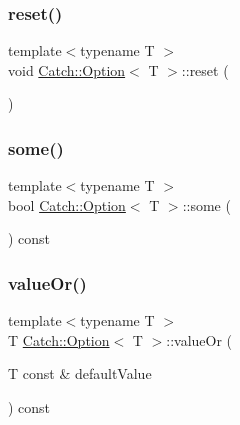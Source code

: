 \mbox{\label{class_catch_1_1_option_a37b4e0e5d4d56296adacd267a616f4e0}} 
\subsubsection{\texorpdfstring{reset()}{reset()}}
{\footnotesize\ttfamily template$<$typename T $>$ \\
void \mbox{\hyperlink{class_catch_1_1_option}{Catch\+::\+Option}}$<$ T $>$\+::reset (\begin{DoxyParamCaption}{ }\end{DoxyParamCaption})\hspace{0.3cm}{\ttfamily [inline]}}

\mbox{\label{class_catch_1_1_option_a97c95829afbe92f2bcc5fd75b32c0825}} 
\subsubsection{\texorpdfstring{some()}{some()}}
{\footnotesize\ttfamily template$<$typename T $>$ \\
bool \mbox{\hyperlink{class_catch_1_1_option}{Catch\+::\+Option}}$<$ T $>$\+::some (\begin{DoxyParamCaption}{ }\end{DoxyParamCaption}) const\hspace{0.3cm}{\ttfamily [inline]}}

\mbox{\label{class_catch_1_1_option_a8d9ae2e30b0eb76fe134a6fbc8423124}} 
\subsubsection{\texorpdfstring{value\+Or()}{valueOr()}}
{\footnotesize\ttfamily template$<$typename T $>$ \\
T \mbox{\hyperlink{class_catch_1_1_option}{Catch\+::\+Option}}$<$ T $>$\+::value\+Or (\begin{DoxyParamCaption}\item[{T const \&}]{default\+Value }\end{DoxyParamCaption}) const\hspace{0.3cm}{\ttfamily [inline]}}



